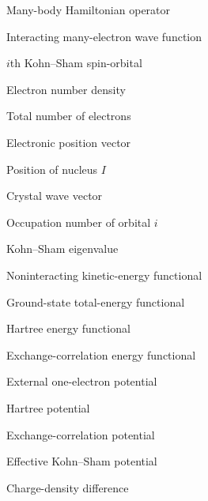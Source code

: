 
\begin{thesisfrontmatterentries}
  \item[\(\hat{H}\)] Many-body Hamiltonian operator
  \item[\(\Psi\)] Interacting many-electron wave function
  \item[\(\psi_i(\vec{r}\,)\)] \(i\)th Kohn--Sham spin-orbital
  \item[\(n(\vec{r}\,)\)] Electron number density
  \item[\(N\)] Total number of electrons
  \item[\(\vec{r}\)] Electronic position vector
  \item[\(\vec{R}_I\)] Position of nucleus \(I\)
  \item[\(\vec{k}\)] Crystal wave vector
  \item[\(f_i\)] Occupation number of orbital \(i\)
  \item[\(\lambda_i\)] Kohn--Sham eigenvalue
  \item[{\(T_s[n]\)}] Noninteracting kinetic-energy functional
  \item[{\(E[n]\)}] Ground-state total-energy functional
  \item[{\(E_{\mathrm{H}}[n]\)}] Hartree energy functional
  \item[{\(E_{\mathrm{xc}}[n]\)}] Exchange-correlation energy functional
  \item[\(v_{\mathrm{ext}}(\vec{r}\,)\)] External one-electron potential
  \item[{\(v_{\mathrm{H}}([n];\vec{r}\,)\)}] Hartree potential
  \item[{\(v_{\mathrm{xc}}([n];\vec{r}\,)\)}] Exchange-correlation potential
  \item[{\(v_{\mathrm{eff}}([n];\vec{r}\,)\)}] Effective Kohn--Sham potential
  \item[\(\Delta\rho(\vec{r}\,)\)] Charge-density difference
\end{thesisfrontmatterentries}


